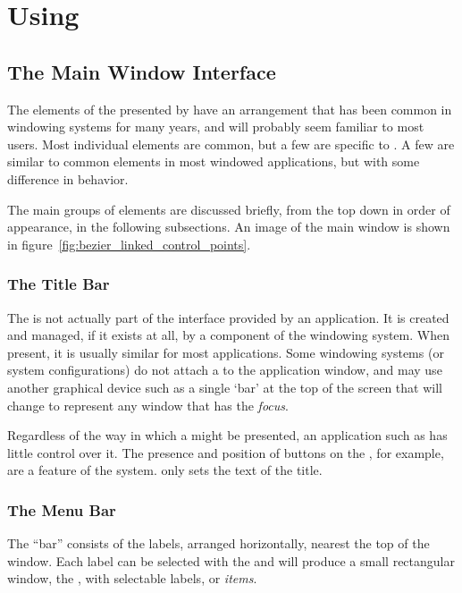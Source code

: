 \chapter{Using \dtypkgu{}}

	\section{The Main Window Interface}%
	The elements of the  presented by \IXpkg{}
	have an arrangement that has been common in
	windowing systems for many years, and will probably
	seem familiar to most users. Most individual elements are common,
	but a few are specific to \IXpkg{}. A few are similar
	to common elements in most windowed applications,
	but with some difference in behavior.

	The main groups of  elements are
	discussed briefly, from the top down in order of appearance,
	in the following subsections. An image of the main window
	is shown in figure~\ref{fig:bezier_linked_control_points}.

		\subsection{The Title Bar}%
		The  is not actually part of
		the interface provided by an application. It is
		created and managed, if it exists at all, by a
		component of the windowing system. When present,
		it is usually similar for most applications. Some
		windowing systems (or system configurations) do not
		attach a  to the application window,
		and may use another graphical device such as a
		single `bar' at the top of the screen that will
		change to represent any window that has the \emph{focus}.
		
		Regardless of the way in which a 
		might be presented, an application such as \IXpkg{}
		has little control over it. The presence and position
		of buttons on the , for example,
		are a feature of the system. \IXpkgu{} only sets
		the text of the title.

		\subsection{The Menu Bar}%
		The  ``bar'' consists of the labels, arranged
		horizontally, nearest the top of the window. Each
		label can be selected with the  and
		will produce a small rectangular window, the
		, with selectable labels, or
		\emph{items}.
		
